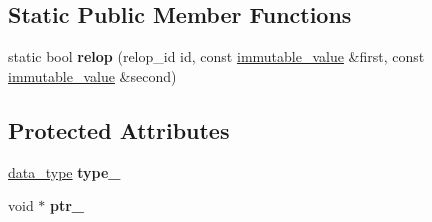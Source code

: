 \subsection*{Static Public Member Functions}
\begin{DoxyCompactItemize}
\item 
\mbox{\label{classdialog_1_1immutable__value_a9df66569c81cb35fff4145e2828fb59b}} 
static bool {\bfseries relop} (relop\+\_\+id id, const \hyperlink{classdialog_1_1immutable__value}{immutable\+\_\+value} \&first, const \hyperlink{classdialog_1_1immutable__value}{immutable\+\_\+value} \&second)
\end{DoxyCompactItemize}
\subsection*{Protected Attributes}
\begin{DoxyCompactItemize}
\item 
\mbox{\label{classdialog_1_1immutable__value_a41fee6407da893d330004b5090c13eb7}} 
\hyperlink{structdialog_1_1data__type}{data\+\_\+type} {\bfseries type\+\_\+}
\item 
\mbox{\label{classdialog_1_1immutable__value_ad6b3eb9c03908829677df0eba88445da}} 
void $\ast$ {\bfseries ptr\+\_\+}
\end{DoxyCompactItemize}

